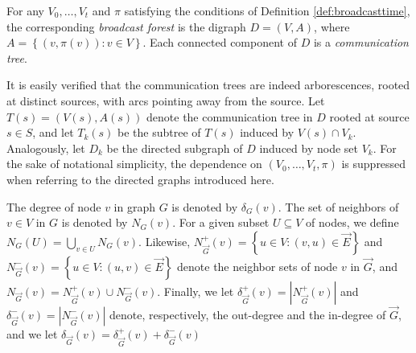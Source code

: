 \begin{definition} \label{def:broadcastgraph}
For any $V_0,\ldots,V_t$ and $\pi$ satisfying the conditions of Definition \ref{def:broadcasttime},
the corresponding \emph{broadcast forest} is
the digraph $D=(V,A)$, where $A=\left\{\left(v,\pi(v)\right): v\in V\right\}$.
Each connected component of $D$ is a \emph{communication tree}.
\end{definition}

\noindent
It is easily verified that the communication trees are indeed arborescences, rooted at distinct sources, with arcs pointing away from the source.
Let $T(s)=\left(V(s),A(s)\right)$ denote the communication tree in $D$ rooted at source $s\in S$,
and let $T_k(s)$ be the subtree of $T(s)$ induced by $V(s)\cap V_k$.
Analogously, let $D_k$ be the directed subgraph of $D$ induced by node set $V_k$.
For the sake of notational simplicity, the dependence on $(V_0,\ldots,V_t,\pi)$ is suppressed when referring to the directed graphs introduced here.

The degree of node $v$ in graph $G$ is denoted by $\delta_G(v)$.
The set of neighbors of $v\in V$ in $G$ is denoted by $N_G(v)$.
For a given subset $U\subseteq V$ of nodes, we define $N_G(U)=\bigcup_{v\in U}N_G(v)$.
Likewise, $N_{\overrightarrow{G}}^+(v)=\left\{u\in V:(v,u)\in \overrightarrow{E}\right\}$ and $N_{\overrightarrow{G}}^-(v)=\left\{u\in V:(u,v)\in \overrightarrow{E}\right\}$ denote the neighbor sets of node $v$ in $\overrightarrow{G}$,
and $N_{\overrightarrow{G}}(v)=N_{\overrightarrow{G}}^+(v)\cup N_{\overrightarrow{G}}^-(v)$.
Finally, we let $\delta^+_{\overrightarrow{G}}(v)=\left|N_{\overrightarrow{G}}^+(v)\right|$ and $\delta^-_{\overrightarrow{G}}(v)=\left|N_{\overrightarrow{G}}^-(v)\right|$ denote, respectively, the out-degree and the in-degree of $\overrightarrow{G}$,
and we let $\delta_{\overrightarrow{G}}(v)=\delta_{\overrightarrow{G}}^+(v)+\delta_{\overrightarrow{G}}^-(v)$

